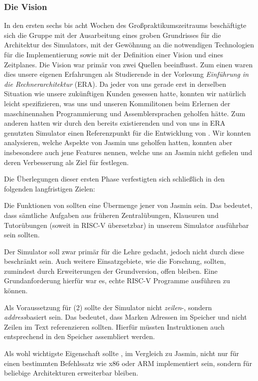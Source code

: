 
\subsubsection{Die Vision}
\label{team:orga-plan-vision}

In den ersten sechs bis acht Wochen des Großpraktikumszeitraums beschäftigte
sich die Gruppe mit der Ausarbeitung eines groben Grundrisses für die
Architektur des Simulators, mit der Gewöhnung an die notwendigen Technologien
für die Implementierung sowie mit der Definition einer Vision und eines
Zeitplanes. Die Vision war primär von zwei Quellen beeinflusst. Zum einen waren
dies unsere eigenen Erfahrungen als Studierende in der Vorlesung
\emph{Einführung in die Rechnerarchitektur} (ERA). Da jeder von uns gerade erst
in derselben Situation wie unsere zukünftigen Kunden gesessen hatte, konnten wir
natürlich leicht spezifizieren, was uns und unseren Kommilitonen beim Erlernen
der maschinennahen Programmierung und Assemblersprachen geholfen hätte. Zum
anderen hatten wir durch den bereits existierenden und von uns in ERA genutzten
Simulator einen Referenzpunkt für die Entwicklung von \erasim{}. Wir konnten
analysieren, welche Aspekte von Jasmin uns geholfen hatten, konnten aber
insbesondere auch jene Features nennen, welche uns an Jasmin nicht gefielen und
deren Verbesserung als Ziel für \erasim{} festlegen.

Die Überlegungen dieser ersten Phase verfestigten sich schließlich in den
folgenden langfristigen Zielen:
\begin{senumerate}{-0.45cm}
  \item Die Funktionen von \erasim{} sollten eine Übermenge jener von Jasmin
  sein. Das bedeutet, dass sämtliche Aufgaben aus früheren Zentralübungen,
  Klausuren und Tutorübungen (soweit in RISC-V übersetzbar) in unserem Simulator ausführbar sein sollten.
  \item Der Simulator soll zwar primär für die Lehre gedacht, jedoch nicht durch
  diese beschränkt sein. Auch weitere Einsatzgebiete, wie die Forschung,
  sollten, zumindest durch Erweiterungen der Grundversion, offen bleiben. Eine
  Grundanforderung hierfür war es, echte RISC-V Programme ausführen zu können.
  \item Als Voraussetzung für (2) sollte der Simulator nicht \emph{zeilen}-,
  sondern \emph{address}basiert sein. Das bedeutet, dass Marken Adressen im
  Speicher und nicht Zeilen im Text referenzieren sollten. Hierfür müssten
  Instruktionen auch entsprechend in den Speicher assembliert werden.
  \item Als wohl wichtigste Eigenschaft sollte \erasim{}, im Vergleich zu
  Jasmin, nicht nur für einen bestimmten Befehlssatz wie x86 oder ARM
  implementiert sein, sondern für beliebige Architekturen erweiterbar bleiben.
  \vspace{-0.4cm}
\end{senumerate}
